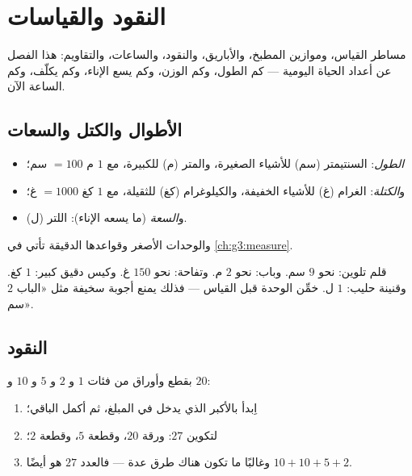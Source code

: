 \chapter{النقود والقياسات}\label{ch:g2:measure}

مساطر القياس، وموازين المطبخ، والأباريق، والنقود، والساعات،
والتقاويم: هذا الفصل عن أعداد الحياة اليومية --- كم الطول، وكم
الوزن، وكم يسع الإناء، وكم يكلّف، وكم الساعة
الآن.

\section{الأطوال والكتل والسعات}

\begin{definition}\label{def:g2:measure:units}
\begin{itemize}
  \item \emph{الطول}: السنتيمتر (سم) للأشياء الصغيرة، والمتر (م)
        للكبيرة، مع $1$ م $= 100$ سم؛
  \item و\emph{الكتلة}: الغرام (غ) للأشياء الخفيفة،
        والكيلوغرام (كغ) للثقيلة، مع $1$ كغ $= 1000$ غ؛
  \item و\emph{السعة} (ما يسعه الإناء): اللتر (ل).
\end{itemize}
والوحدات الأصغر وقواعدها الدقيقة تأتي في \cref{ch:g3:measure}.
\end{definition}

\begin{example}[أي وحدة؟]\label{ex:g2:measure:choose}
قلم تلوين: نحو $9$ سم. وباب: نحو $2$ م. وتفاحة: نحو $150$
غ. وكيس دقيق كبير: $1$ كغ. وقنينة حليب: $1$ ل. خمِّن الوحدة قبل
القياس --- فذلك يمنع أجوبة سخيفة مثل «الباب $2$
سم».
\end{example}

\section{النقود}

\begin{method}\label{met:g2:measure:money}
بقطع وأوراق من فئات $1$ و $2$ و $5$ و $10$ و $20$:
\begin{enumerate}
  \item اِبدأ بالأكبر الذي يدخل في المبلغ، ثم أكمل الباقي؛
  \item لتكوين $27$: ورقة $20$، وقطعة $5$، وقطعة $2$؛
  \item وغالبًا ما تكون هناك طرق عدة --- فالعدد $27$ هو أيضًا
        $10 + 10 + 5 + 2$.
\end{enumerate}
\end{method}

